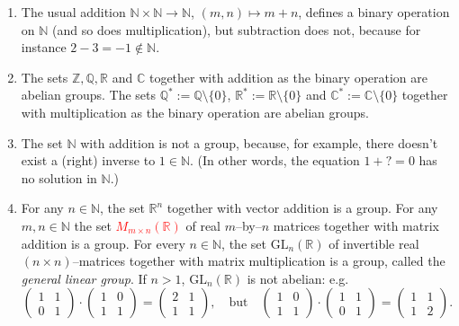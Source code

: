 \documentclass[
  12pt,
  a4paper,
  twoside]{article}
\theoremstyle{plain}
\theoremstyle{definition}
\begin{document}
\begin{enumerate}
\def\labelenumi{(\alph{enumi})}
\item
  The usual addition \(\mathbb{N}\times\mathbb{N}\to\mathbb{N}\), \((m,n)\mapsto m+n\), defines a binary operation on \(\mathbb{N}\) (and so does multiplication), but subtraction does not, because for instance \(2-3=-1\not\in\mathbb{N}\).
\item
  The sets \(\mathbb{Z}, \mathbb{Q}, \mathbb{R}\) and \(\mathbb{C}\) together with addition as the binary operation are abelian groups. The sets \(\mathbb{Q}^*:=\mathbb{Q}\setminus\{0\}\), \(\mathbb{R}^*:=\mathbb{R}\setminus\{0\}\) and \(\mathbb{C}^*:=\mathbb{C}\setminus\{0\}\) together with multiplication as the binary operation are abelian groups.
\item
  The set \(\mathbb{N}\) with addition is not a group, because, for example, there doesn't exist a (right) inverse to \(1\in\mathbb{N}\). (In other words, the equation \(1+ ? =0\) has no solution in \(\mathbb{N}\).)
\item
  For any \(n\in\mathbb{N}\), the set \(\mathbb{R}^n\) together with vector addition is a group. For any \(m,n\in\mathbb{N}\) the set \textcolor{red}{$M_{m\times n}(\mathbb{R})$} of real \(m\)--by--\(n\) matrices together with matrix addition is a group. For every \(n\in \mathbb{N}\), the set \(\mathrm{GL}_n(\mathbb{R})\) of invertible real \((n\times n)\)--matrices together with matrix multiplication is a group, called the \emph{general linear group}. If \(n>1\), \(\mathrm{GL}_n(\mathbb{R})\) is not abelian: e.g.
  \[
  \begin{pmatrix}1&1\\0&1\end{pmatrix}\cdot
  \begin{pmatrix}1&0\\1&1\end{pmatrix} =
  \begin{pmatrix}2&1\\1&1\end{pmatrix}, \quad \text{but} \quad
  \begin{pmatrix}1&0\\1&1\end{pmatrix}\cdot
  \begin{pmatrix}1&1\\0&1\end{pmatrix} =
  \begin{pmatrix}1&1\\1&2\end{pmatrix}.
  \]
\end{enumerate}
\end{document}
